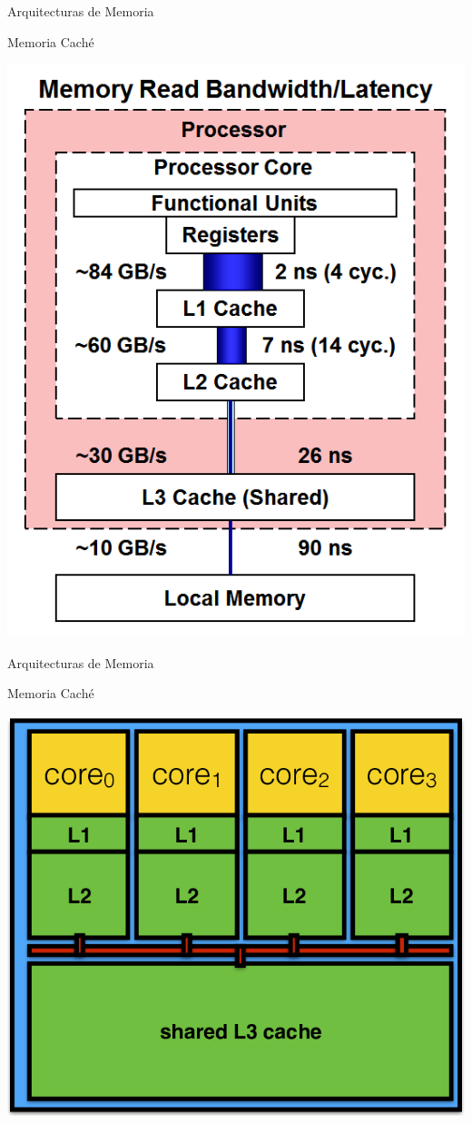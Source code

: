 \begin{frame}{Arquitecturas de Memoria}
    \begin{block}{Memoria Caché}
        \begin{center}
            \includegraphics[width=.5\linewidth]{../imagenes/memLevels}
        \end{center}
    \end{block}
\end{frame}

\begin{frame}{Arquitecturas de Memoria}
    \begin{block}{Memoria Caché}
        \begin{center}
            \includegraphics[width=.7\linewidth]{../imagenes/CPUcache}
        \end{center}
    \end{block}
\end{frame}

